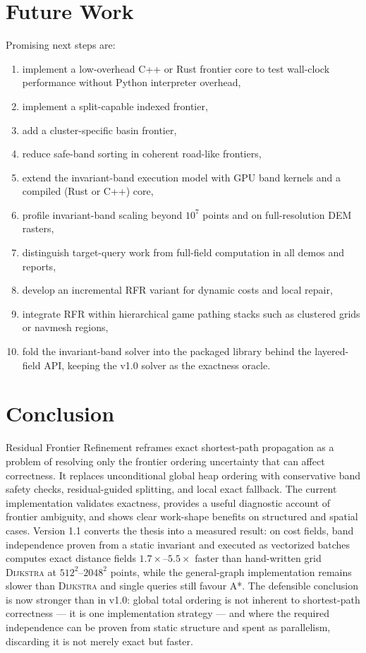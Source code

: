 \documentclass[11pt]{article}
\newcommand{\RFR}{\textsc{RFR}}
\newcommand{\Dijkstra}{\textsc{Dijkstra}}
\begin{document}
\section{Future Work}

Promising next steps are:

\begin{enumerate}
  \item implement a low-overhead C++ or Rust frontier core to test wall-clock performance without Python interpreter overhead,
  \item implement a split-capable indexed frontier,
  \item add a cluster-specific basin frontier,
  \item reduce safe-band sorting in coherent road-like frontiers,
  \item extend the invariant-band execution model with GPU band kernels and a compiled (Rust or C++) core,
  \item profile invariant-band scaling beyond $10^7$ points and on full-resolution DEM rasters,
  \item distinguish target-query work from full-field computation in all demos and reports,
  \item develop an incremental \RFR{} variant for dynamic costs and local repair,
  \item integrate \RFR{} within hierarchical game pathing stacks such as clustered grids or navmesh regions,
  \item fold the invariant-band solver into the packaged library behind the layered-field API, keeping the v1.0 solver as the exactness oracle.
\end{enumerate}

\section{Conclusion}

Residual Frontier Refinement reframes exact shortest-path propagation as a problem of resolving only the frontier ordering uncertainty that can affect correctness. It replaces unconditional global heap ordering with conservative band safety checks, residual-guided splitting, and local exact fallback. The current implementation validates exactness, provides a useful diagnostic account of frontier ambiguity, and shows clear work-shape benefits on structured and spatial cases. Version 1.1 converts the thesis into a measured result: on cost fields, band independence proven from a static invariant and executed as vectorized batches computes exact distance fields $1.7\times$--$5.5\times$ faster than hand-written grid \Dijkstra{} at $512^2$--$2048^2$ points, while the general-graph implementation remains slower than \Dijkstra{} and single queries still favour A*. The defensible conclusion is now stronger than in v1.0: global total ordering is not inherent to shortest-path correctness --- it is one implementation strategy --- and where the required independence can be proven from static structure and spent as parallelism, discarding it is not merely exact but faster.
\end{document}
